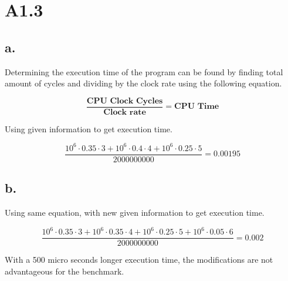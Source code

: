 \section*{A1.3}

\subsection*{a.}
Determining the execution time of the program can be found by finding total amount of cycles and dividing by the clock rate using the following equation.

$$ \frac{\textbf{CPU Clock Cycles}}{\textbf{Clock rate}} = \textbf{CPU Time} $$

Using given information to get execution time.

$$\frac{10^6\cdot0.35\cdot3+10^6\cdot0.4\cdot4+10^6\cdot0.25\cdot5}{2000000000} = 0.00195 $$

\subsection*{b.}

Using same equation, with new given information to get execution time.

$$\frac{10^6\cdot0.35\cdot3+10^6\cdot0.35\cdot4+10^6\cdot0.25\cdot5+10^6\cdot0.05\cdot6}{2000000000} = 0.002 $$

With a 500 micro seconds longer execution time, the modifications are not advantageous for the benchmark.
\newpage
